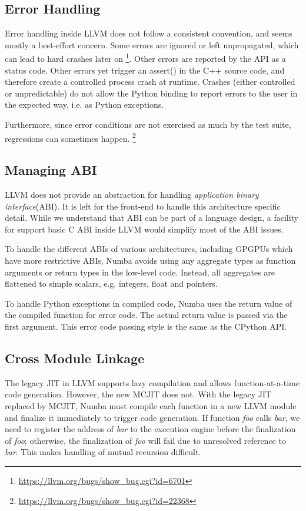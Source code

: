 \documentclass{acm_proc_article-sp}
\begin{document}
\subsection{Error Handling}

Error handling inside LLVM does not follow a consistent convention,
and seems mostly a best-effort concern.  Some errors are ignored or
left unpropagated, which can lead to hard crashes later on
\footnote{\url{https://llvm.org/bugs/show_bug.cgi?id=6701}}.  Other
errors are reported by the API as a status code.  Other errors yet
trigger an assert() in the C++ source code, and therefore create a
controlled process crash at runtime.  Crashes (either controlled or
unpredictable) do not allow the Python binding to report errors to the
user in the expected way, i.e. as Python exceptions.

Furthermore, since error conditions are not exercised as much by the test
suite, regressions can sometimes happen.
\footnote{\url{https://llvm.org/bugs/show_bug.cgi?id=22368}}

\subsection{Managing ABI}

LLVM does not provide an abstraction for handling \textit{application binary
interface}(ABI). It is left for the front-end to handle this architecture
specific detail.  While we understand that ABI can be part of a language
design, a facility for support basic C ABI inside LLVM would simplify most of the
ABI issues.

To handle the different ABIs of various architectures, including GPGPUs which
have more restrictive ABIs, Numba avoids using any aggregate types as function
arguments or return types in the low-level code.  Instead, all aggregates are
flattened to simple scalars, e.g. integers, float and pointers.

To handle Python exceptions in compiled code, Numba uses the return
value of the compiled function for error code. The actual return value
is passed via the first argument. This error code passing style is the
same as the CPython API.

\subsection{Cross Module Linkage}

The legacy JIT in LLVM supports lazy compilation and allows function-at-a-time
code generation.  However, the new MCJIT does not. With the legacy JIT replaced
by MCJIT, Numba must compile each function in a new LLVM module and finalize it
immediately to trigger code generation. If function \textit{foo} calls
\textit{bar}, we need to register the address of \textit{bar} to the execution
engine before the finalization of \textit{foo}; otherwise, the finalization of
\textit{foo} will fail due to unresolved reference to \textit{bar}.
This makes handling of mutual recursion difficult.
\end{document}
